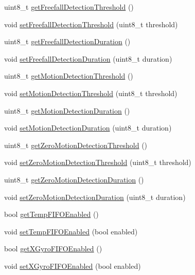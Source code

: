\begin{DoxyCompactItemize}
uint8\+\_\+t \hyperlink{classMPU6050_ac7f5c0511fe9d0f3525a3757498daed7}{get\+Freefall\+Detection\+Threshold} ()
\item 
void \hyperlink{classMPU6050_af704e1a4eb01522b146abeba78c32716}{set\+Freefall\+Detection\+Threshold} (uint8\+\_\+t threshold)
\item 
uint8\+\_\+t \hyperlink{classMPU6050_a3cff6b9613ad01aa1a51c287f5c5e329}{get\+Freefall\+Detection\+Duration} ()
\item 
void \hyperlink{classMPU6050_a41eeb40a654465966d260e3d31c4de4b}{set\+Freefall\+Detection\+Duration} (uint8\+\_\+t duration)
\item 
uint8\+\_\+t \hyperlink{classMPU6050_ab7a825b1b8b86cebda308289630795e7}{get\+Motion\+Detection\+Threshold} ()
\item 
void \hyperlink{classMPU6050_aa23c8d66502345c30915e69975fd2cc9}{set\+Motion\+Detection\+Threshold} (uint8\+\_\+t threshold)
\item 
uint8\+\_\+t \hyperlink{classMPU6050_a8ba035c2ae4a05d7e51b0d29e4924fb0}{get\+Motion\+Detection\+Duration} ()
\item 
void \hyperlink{classMPU6050_a6d81616aaa47539217057891c91ff08f}{set\+Motion\+Detection\+Duration} (uint8\+\_\+t duration)
\item 
uint8\+\_\+t \hyperlink{classMPU6050_ad941c1e844dc9230675c115734599ea3}{get\+Zero\+Motion\+Detection\+Threshold} ()
\item 
void \hyperlink{classMPU6050_a347a51fd25de20b9ead4659015ef793b}{set\+Zero\+Motion\+Detection\+Threshold} (uint8\+\_\+t threshold)
\item 
uint8\+\_\+t \hyperlink{classMPU6050_a04c0fcdcd0157b6dbf74d4901424801e}{get\+Zero\+Motion\+Detection\+Duration} ()
\item 
void \hyperlink{classMPU6050_a6d25a21e1673682f096399b719c66d2c}{set\+Zero\+Motion\+Detection\+Duration} (uint8\+\_\+t duration)
\item 
bool \hyperlink{classMPU6050_a913c2095001e204b5b09f8382a86d2ca}{get\+Temp\+F\+I\+F\+O\+Enabled} ()
\item 
void \hyperlink{classMPU6050_ae528a25b4997ad0e3091a012e4e4419e}{set\+Temp\+F\+I\+F\+O\+Enabled} (bool enabled)
\item 
bool \hyperlink{classMPU6050_ada9a553176b57815f23fb7d71bb85c9d}{get\+X\+Gyro\+F\+I\+F\+O\+Enabled} ()
\item 
void \hyperlink{classMPU6050_a53a03d1f255a62f01375c870cdc85767}{set\+X\+Gyro\+F\+I\+F\+O\+Enabled} (bool enabled)
\item 

\end{DoxyCompactItemize}
